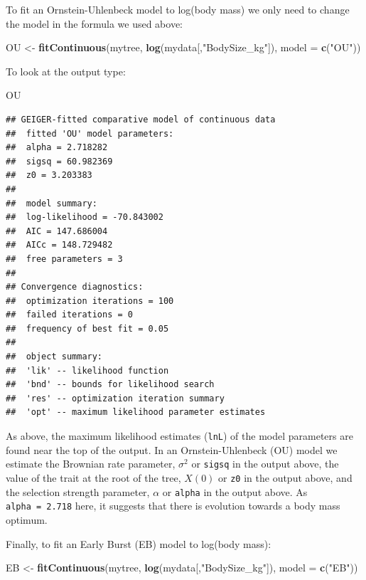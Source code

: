 \documentclass[]{book}
\newenvironment{Shaded}{\begin{snugshade}}{\end{snugshade}}
\newcommand{\KeywordTok}[1]{\textcolor[rgb]{0.13,0.29,0.53}{\textbf{{#1}}}}
\newcommand{\DataTypeTok}[1]{\textcolor[rgb]{0.13,0.29,0.53}{{#1}}}
\newcommand{\StringTok}[1]{\textcolor[rgb]{0.31,0.60,0.02}{{#1}}}
\newcommand{\NormalTok}[1]{{#1}}
\begin{document}
To fit an Ornstein-Uhlenbeck model to log(body mass) we only need to
change the model in the formula we used above:

\begin{Shaded}
\begin{Highlighting}[]
\NormalTok{OU <-}\StringTok{ }\KeywordTok{fitContinuous}\NormalTok{(mytree, }\KeywordTok{log}\NormalTok{(mydata[,}\StringTok{"BodySize_kg"}\NormalTok{]), }\DataTypeTok{model =} \KeywordTok{c}\NormalTok{(}\StringTok{"OU"}\NormalTok{))}
\end{Highlighting}
\end{Shaded}

To look at the output type:

\begin{Shaded}
\begin{Highlighting}[]
\NormalTok{OU}
\end{Highlighting}
\end{Shaded}

\begin{verbatim}
## GEIGER-fitted comparative model of continuous data
##  fitted 'OU' model parameters:
##  alpha = 2.718282
##  sigsq = 60.982369
##  z0 = 3.203383
## 
##  model summary:
##  log-likelihood = -70.843002
##  AIC = 147.686004
##  AICc = 148.729482
##  free parameters = 3
## 
## Convergence diagnostics:
##  optimization iterations = 100
##  failed iterations = 0
##  frequency of best fit = 0.05
## 
##  object summary:
##  'lik' -- likelihood function
##  'bnd' -- bounds for likelihood search
##  'res' -- optimization iteration summary
##  'opt' -- maximum likelihood parameter estimates
\end{verbatim}

As above, the maximum likelihood estimates (\texttt{lnL}) of the model
parameters are found near the top of the output. In an
Ornstein-Uhlenbeck (OU) model we estimate the Brownian rate parameter,
\(\sigma^2\) or \texttt{sigsq} in the output above, the value of the
trait at the root of the tree, \(X(0)\) or \texttt{z0} in the output
above, and the selection strength parameter, \(\alpha\) or
\texttt{alpha} in the output above. As \texttt{alpha\ =\ 2.718} here, it
suggests that there is evolution towards a body mass optimum.

Finally, to fit an Early Burst (EB) model to log(body mass):

\begin{Shaded}
\begin{Highlighting}[]
\NormalTok{EB <-}\StringTok{ }\KeywordTok{fitContinuous}\NormalTok{(mytree, }\KeywordTok{log}\NormalTok{(mydata[,}\StringTok{"BodySize_kg"}\NormalTok{]), }\DataTypeTok{model =} \KeywordTok{c}\NormalTok{(}\StringTok{"EB"}\NormalTok{))}
\end{Highlighting}
\end{Shaded}
\end{document}
